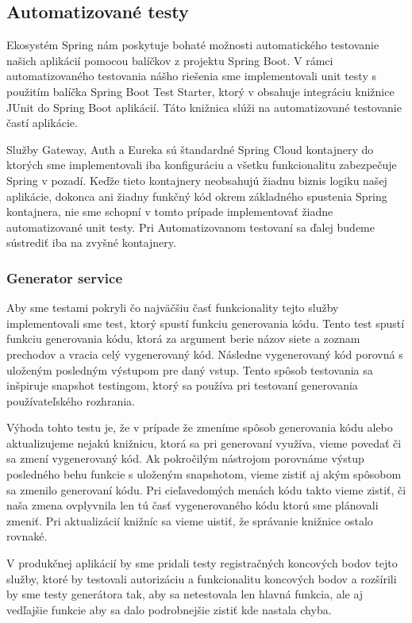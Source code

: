 \subsection{Automatizované testy}

Ekosystém Spring nám poskytuje bohaté možnosti automatického testovanie našich aplikácií pomocou balíčkov z projektu Spring Boot. V rámci automatizovaného testovania nášho riešenia sme implementovali unit testy s použitím balíčka Spring Boot Test Starter, ktorý v obsahuje integráciu knižnice JUnit do Spring Boot aplikácií. Táto knižnica slúži na automatizované testovanie častí aplikácie. 

Služby Gateway, Auth a Eureka sú štandardné Spring Cloud kontajnery do ktorých sme implementovali iba konfiguráciu a všetku funkcionalitu zabezpečuje Spring v pozadí. Keďže tieto kontajnery neobsahujú žiadnu biznis logiku našej aplikácie, dokonca ani žiadny funkčný kód okrem základného spustenia Spring kontajnera, nie sme schopní v tomto prípade implementovať žiadne automatizované unit testy. Pri Automatizovanom testovaní sa ďalej budeme sústrediť iba na zvyšné kontajnery.


\subsubsection{Generator service}
Aby sme testami pokryli čo najväčšiu časť funkcionality tejto služby implementovali sme test, ktorý spustí funkciu generovania kódu. Tento test spustí funkciu generovania kódu, ktorá za argument berie názov siete a zoznam prechodov a vracia celý vygenerovaný kód. Následne vygenerovaný kód porovná s uloženým posledným výstupom pre daný vstup. Tento spôsob testovania sa inšpiruje snapshot testingom, ktorý sa používa pri testovaní generovania používateľského rozhrania. 

Výhoda tohto testu je, že v prípade že zmeníme spôsob generovania kódu alebo aktualizujeme nejakú knižnicu, ktorá sa pri generovaní využíva, vieme povedať či sa zmení vygenerovaný kód. Ak pokročilým nástrojom porovnáme výstup posledného behu funkcie s uloženým snapshotom, vieme zistiť aj akým spôsobom sa zmenilo generovaní kódu. 
Pri cieľavedomých menách kódu takto vieme zistiť, či naša zmena ovplyvnila len tú časť vygenerovaného kódu ktorú sme plánovali zmeniť.
Pri aktualizácií knižníc sa vieme uistiť, že správanie knižnice ostalo rovnaké.

V produkčnej aplikácií by sme pridali testy registračných koncových bodov tejto služby, ktoré by testovali autorizáciu a funkcionalitu koncových bodov a rozšírili by sme testy generátora tak, aby sa netestovala len hlavná funkcia, ale aj vedľajšie funkcie aby sa dalo podrobnejšie zistiť kde nastala chyba.


